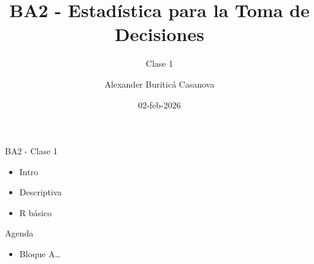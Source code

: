 \documentclass[
  ignorenonframetext,
]{beamer}
\title{BA2 - Estadística para la Toma de Decisiones}
\subtitle{Clase 1}
\author{Alexander Buriticá Casanova}
\date{02-feb-2026}
\providecommand{\tightlist}{%
  \setlength{\itemsep}{0pt}\setlength{\parskip}{0pt}}
\begin{document}
\frame{\titlepage}

\begin{frame}{BA2 - Clase 1}
\protect\hypertarget{ba2---clase-1}{}
\begin{itemize}
\tightlist
\item
  Intro
\item
  Descriptiva
\item
  R básico
\end{itemize}
\end{frame}

\begin{frame}{Agenda}
\protect\hypertarget{agenda}{}
\begin{itemize}
\tightlist
\item
  Bloque A\ldots{}
\end{itemize}
\end{frame}
\end{document}
